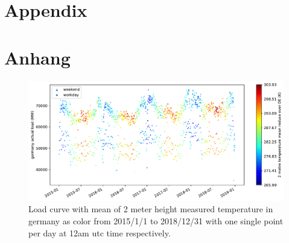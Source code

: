 

{\chapter{Appendix}}    %
{\chapter{Anhang}}      %
\label{chap:appendix}



\vspace{-13mm}

\begin{figure}[H]%
\centering
\includegraphics[width=.94\textheight,angle=-90,origin=c]{plots/t2m_mean_2015010112_2018123112_24F}%
\caption{Load curve with mean of 2 meter height measured temperature in germany as color from 2015/1/1 to 2018/12/31 with one single point per day at 12am utc time respectively.}%
\label{fig:t2m_mean_2015010112_2018123112_24F}%
\end{figure}

		
%		
